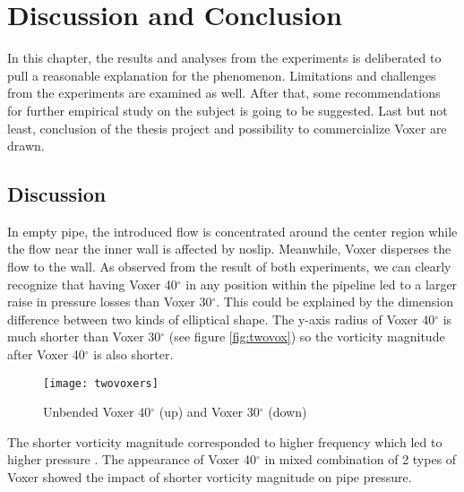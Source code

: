 
\chapter{Discussion and Conclusion}

In this chapter, the results and analyses from the experiments is deliberated to pull a reasonable explanation for the phenomenon. Limitations and challenges from the experiments are examined as well. After that, some recommendations for further empirical study on the subject is going to be suggested. Last but not least, conclusion of the thesis project and possibility to commercialize Voxer are drawn.

\section{Discussion}

In empty pipe, the introduced flow is concentrated around the center region while the flow near the inner wall is affected by \gls{noslip}. Meanwhile, Voxer disperses the flow to the wall. As observed from the result of both experiments, we can clearly recognize that having Voxer 40$^{\circ}$ in any position within the pipeline led to a larger raise in pressure losses than Voxer 30$^{\circ}$. This could be explained by the dimension difference between two kinds of elliptical shape. The y-axis radius of Voxer 40$^{\circ}$ is much shorter than Voxer 30$^{\circ}$  (see figure \vref{fig:twovox}) so the vorticity magnitude after Voxer 40$^{\circ}$ is also shorter. 
\begin{wrapfigure}{r}{0.4\textwidth}
  \begin{center}
    \texttt{[image: twovoxers]}
  \end{center}
  \caption{Unbended Voxer 40$^{\circ}$ (up) and Voxer 30$^{\circ}$ (down)}
  \label{fig:twovox}
\end{wrapfigure}
The shorter vorticity magnitude corresponded to higher frequency which led to higher pressure \cite{scz:article}. The appearance of Voxer 40$^{\circ}$ in mixed combination of 2 types of Voxer showed the impact of shorter vorticity magnitude on pipe pressure.

